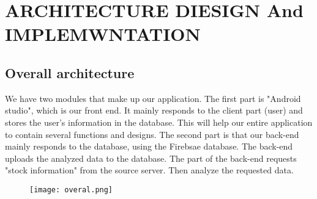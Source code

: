 \documentclass[conference]{IEEEtran}
\begin{document}
 
\section{ARCHITECTURE DIESIGN And IMPLEMWNTATION}


\subsection{Overall architecture}

We have two modules that make up our application. The first part is "Android studio", which is our front end. It mainly responds to the client part (user) and stores the user's information in the database. This will help our entire application to contain several functions and designs. The second part is that our back-end mainly responds to the database, using the Firebsae database. The back-end uploads the analyzed data to the database. The part of the back-end requests "stock information" from the source server. Then analyze the requested data.

\begin{figure}[h]
    \begin{center}
        \centering
        \texttt{[image: overal.png]}
        \caption{}
        \label{fig:my_label}
    \end{center}
    \end{figure}

\newpage
\end{document}
